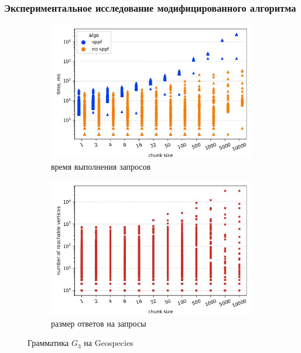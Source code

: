 \documentclass{beamer}
\begin{document}
\begin{frame}
\transwipe[direction=90]
 \frametitle{Экспериментальное исследование модифицированного алгоритма}
          \begin{figure}[H]
    \begin{subfigure}[b]{0.5\textwidth}
    \centering
    \includegraphics[width=\textwidth]{pictures/geospecies_sppf_bt.pdf_1.jpg} \caption{время выполнения запросов}
    \label{fig:subim3}
    \end{subfigure}%
    \begin{subfigure}[b]{0.5\textwidth}
    \centering
    \includegraphics[width=\textwidth]{pictures/geospecies_ans_bt.pdf_1.jpg} \caption{размер ответов на запросы}
    \label{fig:subim4} 
    \end{subfigure} \caption{Грамматика $G_3$ на Geospecies}
\label{ssss}
\end{figure}
\end{frame}
\end{document}
